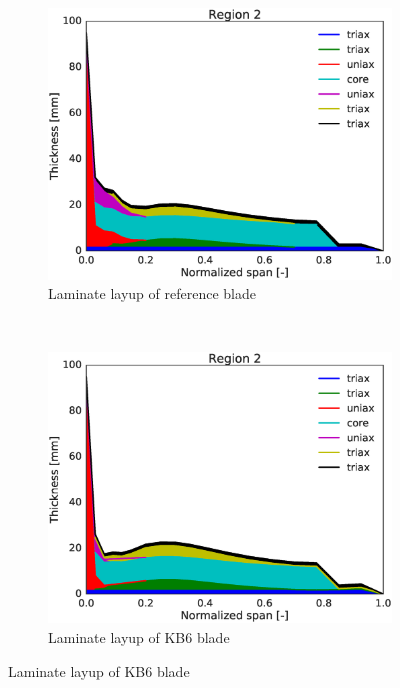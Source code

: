 \begin{figure}[tph]
\begin{subfigure}{0.50\textwidth}
\includegraphics[width=\linewidth]{figures/KB6_final/baseline_laminate_layers_r02.eps}
\caption{Laminate layup of reference blade}
\label{subfig:baseline_layers_r02}
\end{subfigure}
 ~
\begin{subfigure}{0.50\textwidth}
\includegraphics[width=\linewidth]{figures/KB6_final/KB6_laminate_layers_r02.eps}
\caption{Laminate layup of KB6 blade}
\label{subfig:KB6_layers_r02}
\end{subfigure}


\end{figure}
